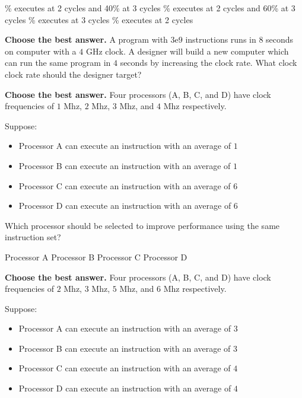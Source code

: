\documentclass{exam}
\begin{document}
\begin{questions}
		\begin{choices}
			\% executes at 2 cycles and 40\% at 3 cycles
			\% executes at 2 cycles and 60\% at 3 cycles
			\% executes at 3 cycles
			\% executes at 2 cycles
		\end{choices}%

\question \textbf{Choose the best answer.}
           A program with $3\mathrm{e}{9}$ instructions runs in $8$ seconds on computer with a $4$ GHz clock. 
           A designer will build a new computer which can run the same program in $4$ seconds by increasing the clock rate. 
           What clock clock rate should the designer target? 
           
		\begin{choices}
			\choice 7.5
			\CorrectChoice 8.0
			\choice 0.75
			\choice 0.8
			\choice 0.075
			\choice 80.0
		\end{choices}%

\question \textbf{Choose the best answer.}
        Four processors (A, B, C, and D) have clock frequencies of $1$ Mhz, $2$ Mhz, $3$ Mhz, and $4$ Mhz respectively.
        
        Suppose:
        \begin{itemize}
            \item[] Processor A can execute an instruction with an average of $1$
            \item[] Processor B can execute an instruction with an average of $1$
            \item[] Processor C can execute an instruction with an average of $6$
            \item[] Processor D can execute an instruction with an average of $6$
        \end{itemize}
        
        Which processor should be selected to improve performance using the same instruction set? 
        
		\begin{choices}
			\choice Processor A
			\CorrectChoice Processor B
			\choice Processor C
			\choice Processor D
		\end{choices}%

\question \textbf{Choose the best answer.}
        Four processors (A, B, C, and D) have clock frequencies of $2$ Mhz, $3$ Mhz, $5$ Mhz, and $6$ Mhz respectively.
        
        Suppose:
        \begin{itemize}
            \item[] Processor A can execute an instruction with an average of $3$
            \item[] Processor B can execute an instruction with an average of $3$
            \item[] Processor C can execute an instruction with an average of $4$
            \item[] Processor D can execute an instruction with an average of $4$
        \end{itemize}
        

\end{questions}
\end{document}
